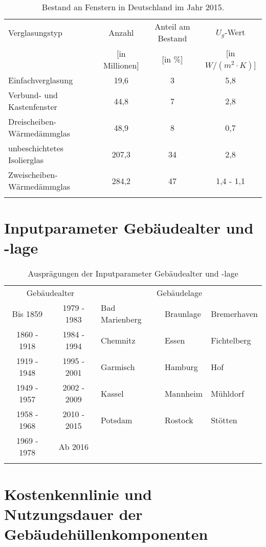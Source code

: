 \begin{table}[H]\centering
\begin{tabular}{lccc}
\toprule[1.5pt]
Verglasungstyp & Anzahl & Anteil am Bestand & \(U_g\)-Wert \\
 & [in Millionen] & [in \%] & [in \(W/(m^2 \cdot K)\)] \\ \addlinespace[5pt]
\midrule[2pt]
Einfachverglasung & 19,6 & 3 & 5,8 \\
\midrule
Verbund- und Kastenfenster & 44,8 & 7 & 2,8 \\
\midrule
Dreischeiben-Wärmedämmglas & 48,9 & 8 & 0,7 \\
\midrule
unbeschichtetes Isolierglas & 207,3 & 34 & 2,8 \\
\midrule
Zweischeiben-Wärmedämmglas & 284,2 & 47 & 1,4 - 1,1 \\
\bottomrule[1.5pt] \addlinespace[10pt]
\end{tabular}
\caption{Bestand an Fenstern in Deutschland im Jahr 2015. \cite{Bigalke.2016}}
\label{tab: TabelleA2}
\end{table}

\section{Inputparameter Gebäudealter und -lage}

\begin{table}[H]\centering
\begin{tabular}{cc|lll}
\toprule[1.5pt]
\multicolumn{2}{c}{Gebäudealter} & \multicolumn{3}{c}{Gebäudelage} \\ \addlinespace[5pt]
\midrule[2pt]
Bis 1859 & 1979 - 1983 & Bad Marienberg & Braunlage & Bremerhaven \\
\midrule
1860 - 1918 & 1984 - 1994 & Chemnitz & Essen & Fichtelberg \\
\midrule
1919 - 1948 & 1995 - 2001 & Garmisch & Hamburg & Hof \\
\midrule
1949 - 1957 & 2002 - 2009 & Kassel & Mannheim & Mühldorf \\
\midrule
1958 - 1968 & 2010 - 2015 & Potsdam & Rostock & Stötten \\
\midrule
1969 - 1978 & Ab 2016 &  &  & \\
\bottomrule[1.5pt] \addlinespace[10pt]
\end{tabular}
\caption{Ausprägungen der Inputparameter Gebäudealter und -lage}
\label{tab: TabelleA3}
\end{table}

\section{Kostenkennlinie und Nutzungsdauer der Gebäudehüllenkomponenten}

